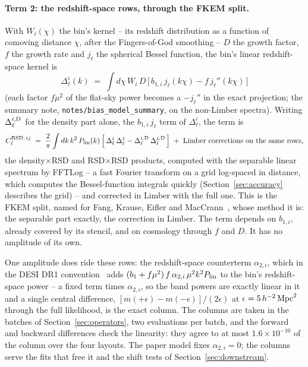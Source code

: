 \documentclass[11pt]{article}
\newcommand{\aunit}{\,h^{-2}\,{\rm Mpc}^2}
\newcommand{\us}{\_\allowbreak}
\begin{document}
\paragraph{Term 2: the redshift-space rows, through the FKEM split.}
With $W_i(\chi)$ the bin's kernel -- its redshift distribution as a
function of comoving distance $\chi$, after the Fingers-of-God
smoothing -- $D$ the growth factor, $f$ the growth rate and $j_\ell$
the spherical Bessel function, the bin's linear redshift-space kernel
is
\begin{equation}
  \Delta^i_\ell(k) \;=\; \int d\chi\, W_i\, D\,
    \bigl[\,b_{1,i}\, j_\ell(k\chi) - f\, j_\ell''(k\chi)\,\bigr]
  \label{eq:kernels}
\end{equation}
(each factor $f\mu^2$ of the flat-sky power becomes a $-j_\ell''$ in
the exact projection; the summary note,
\texttt{notes/bias\us model\us summary}, on the non-Limber
spectra).  Writing $\Delta^{i,{\rm D}}_\ell$ for the density part
alone, the $b_{1,i}\,j_\ell$ term of $\Delta^i_\ell$, the term is
\begin{equation}
  C_\ell^{{\rm RSD},\,ij} \;=\; \frac{2}{\pi}\int dk\, k^2\,
  P_{\rm lin}(k)
  \left[\,\Delta^i_\ell\,\Delta^j_\ell
      - \Delta^{i,{\rm D}}_\ell\,\Delta^{j,{\rm D}}_\ell\,\right]
  \;+\; \text{Limber corrections on the same rows} ,
  \label{eq:rsdterm}
\end{equation}
the density$\times$RSD and RSD$\times$RSD products, computed with the
separable linear spectrum by FFTLog -- a fast Fourier transform on a
grid log-spaced in distance, which computes the Bessel-function
integrals quickly (Section~\ref{sec:accuracy} describes the grid) --
and corrected in Limber with the full one.  This is the FKEM split,
named for Fang, Krause, Eifler and MacCrann~\cite{Fang2020}, whose
method it is: the separable part exactly, the correction in Limber.
The term depends on $b_{1,i}$, already
covered by its stencil, and on cosmology through $f$ and $D$.  It has
no amplitude of its own.

One amplitude does ride these rows: the redshift-space counterterm
$\alpha_{2,i}$, which in the DESI DR1 convention~\cite{Maus2024} adds
$(b_1 + f\mu^2)\,f\,\alpha_{2,i}\,\mu^2 k^2 P_{\rm lin}$ to the bin's
redshift-space power -- a fixed term times $\alpha_{2,i}$, so the band
powers are exactly linear in it and a single central difference,
$[m(+\epsilon) - m(-\epsilon)]/(2\epsilon)$ at
$\epsilon = 5\aunit$ through the full likelihood, is the exact column.
The columns are taken in the batches of
Section~\ref{sec:operators}, two evaluations per batch, and the
forward and backward differences check the linearity: they agree to at
most $1.6\times10^{-10}$ of the column over the four layouts.  The
paper model fixes $\alpha_{2,i} = 0$; the columns serve the fits
that free it and
the shift tests of Section~\ref{sec:downstream}.
\end{document}
